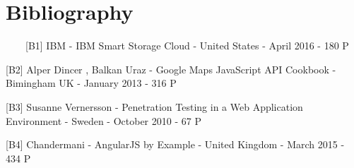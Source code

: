 \chapter*{Bibliography}



~~~~[B1]  IBM - IBM Smart Storage Cloud - United States - April 2016 - 180 P

[B2]  Alper Dincer , Balkan Uraz - Google Maps JavaScript API Cookbook - Bimingham UK - January 2013 - 316 P

[B3] Susanne Vernersson - Penetration Testing in a Web Application Environment - Sweden - October 2010 - 67 P
 
[B4] Chandermani - AngularJS by Example - United Kingdom - March 2015 - 434 P

